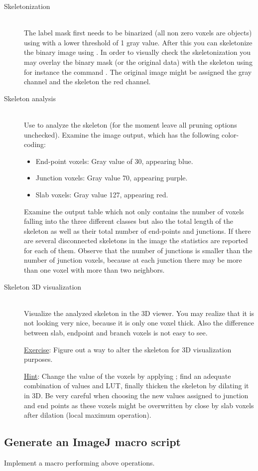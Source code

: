 \begin{description}
\item[Skeletonization]\hfill\\
The label mask first needs to be binarized (all non zero voxels are objects) using  with a lower threshold of 1 gray value. After this you can skeletonize the binary image using .  In order to visually check the skeletonization you may overlay the binary mask (or the original data) with the skeleton using for instance the command . The original image might be assigned the gray channel and the skeleton the red channel.
\item[Skeleton analysis]\hfill\\
Use  to analyze the skeleton (for the moment leave all pruning options unchecked). Examine the image output, which has the following color-coding:
\begin{itemize}
\item End-point voxels: Gray value of 30, appearing blue.
\item Junction voxels: Gray value 70, appearing purple.
\item Slab voxels: Gray value 127, appearing red.
\end{itemize}
Examine the output table which not only contains the number of voxels falling into the three different classes but also the total length of the skeleton as well as their total number of end-points and junctions. If there are several disconnected skeletons in the image the statistics are reported for each of them. Observe that the number of junctions is smaller than the number of junction voxels, because at each junction there may be more than one voxel with more than two neighbors.
\item[Skeleton 3D visualization]\hfill\\
Visualize the analyzed skeleton in the 3D viewer. You may realize that it is not looking very nice, because it is only one voxel thick. Also the difference between slab, endpoint and branch voxels is not easy to see. 

\underline{Exercise}: Figure out a way to alter the skeleton for 3D visualization purposes.

\underline{Hint}: Change the value of the voxels by applying ; find an adequate combination of values and LUT, finally thicken the skeleton by dilating it in 3D. Be very careful when choosing the new values assigned to junction and end points as these voxels might be overwritten by close by slab voxels after dilation (local maximum operation).
\end{description}

\subsection{Generate an ImageJ macro script}
Implement a macro performing above operations.